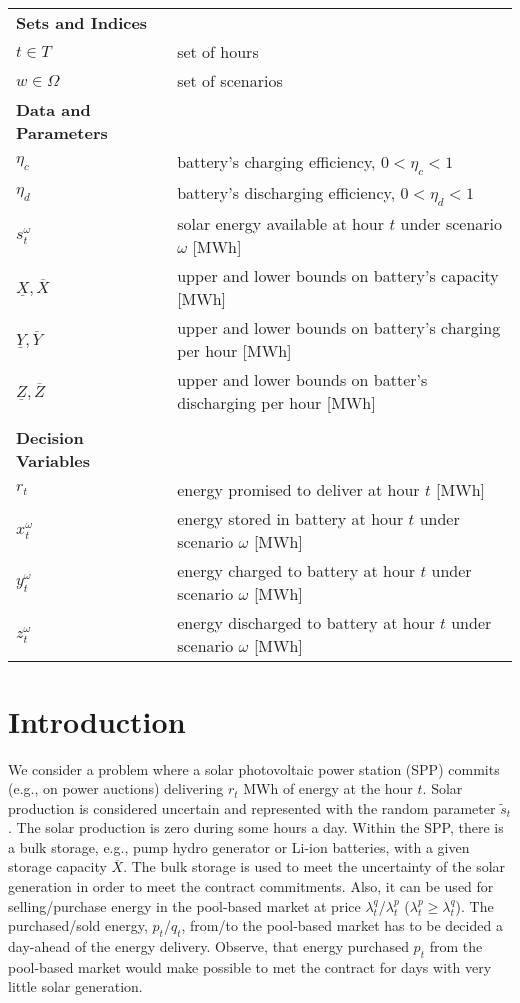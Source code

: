 \documentclass[opre,nonblindrev]{informs3} %
\begin{document}
			\begin{tabular}{l l}
				
				\bf {Sets and Indices} & \\
				$t \in T$ 		 & set of hours\\
				$w \in \Omega$ 		& set of scenarios \\

				\bf {Data and Parameters} & \\
				$\eta_c$ 		& battery's charging efficiency, $ 0 < \eta_c < 1 $   \\
				$\eta_d$ 		& battery's discharging efficiency, $ 0 < \eta_d < 1$   \\
				$s_t^\omega$ & solar energy available at hour $t$ under scenario $\omega$ [MWh]   \\ 
				$\underline{X}, \overline{X}$ 		& upper and lower bounds on battery's capacity [MWh]  \\
				$\underline{Y}, \overline{Y}$ 		& upper and lower bounds on battery's charging per hour  [MWh]  \\
				$\underline{Z}, \overline{Z}$ 		& upper and lower bounds on batter's discharging per hour [MWh]  \\\\
				
				\bf {Decision Variables} & \\
				$r_t$ 		     		   & energy promised to deliver at hour $t$ [MWh]  \\
				$x_t^\omega$ 		 & energy stored in battery at hour $t$ under scenario $\omega$ [MWh]  \\
				$y_t^\omega$ 		 & energy charged to battery at hour $t$ under scenario $\omega$ [MWh]  \\
				$z_t^\omega$ 		 & energy discharged to battery at hour $t$ under scenario $\omega$ [MWh]  \\
			\end{tabular}
		\label{tab:notation}
	
	\section{Introduction}
	
	We consider a problem where a solar photovoltaic power station (SPP) commits (e.g., on power auctions) delivering $r_t$ MWh of energy at the hour $t$. Solar production is considered uncertain and represented with the random parameter $\tilde{s}_t$. The solar production is zero during some hours a day.
	Within the SPP, there is a bulk storage, e.g., pump hydro generator or Li-ion batteries, with a given storage capacity $ \overline{X}$. The bulk storage is used to meet the uncertainty of the solar generation in order to meet the contract commitments. Also, it can be used for selling/purchase energy in the pool-based market at price $\lambda_t^q$/$\lambda_t^p$ ($\lambda_t^p \ge \lambda_t^q$). The purchased/sold energy, $p_t$/$q_t$, from/to the pool-based market has to be decided a day-ahead of the energy delivery. Observe, that energy purchased $p_t$ from the pool-based market would make  possible to met the contract for days with very little solar generation. 
	
\end{document}
